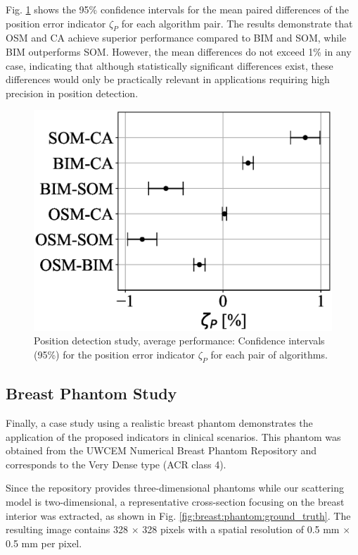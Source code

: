 \documentclass{IEEEtran}
\begin{document}
                Fig. \ref{fig:position:average:confidence_intervals} shows the 95\% confidence intervals for the mean paired differences of the position error indicator $\zeta_P$ for each algorithm pair. The results demonstrate that OSM and CA achieve superior performance compared to BIM and SOM, while BIM outperforms SOM. However, the mean differences do not exceed 1\% in any case, indicating that although statistically significant differences exist, these differences would only be practically relevant in applications requiring high precision in position detection.

                \begin{figure}
                    \centering
                    \includegraphics[width=.8\columnwidth]{./experiments/position/average/figs/confidence_intervals.eps}
                    \caption{Position detection study, average performance: Confidence intervals (95\%) for the position error indicator $\zeta_P$ for each pair of algorithms.}
                    \label{fig:position:average:confidence_intervals}
                \end{figure}

        \subsection{Breast Phantom Study}\label{sec:results:breast}

            Finally, a case study using a realistic breast phantom demonstrates the application of the proposed indicators in clinical scenarios. This phantom was obtained from the UWCEM Numerical Breast Phantom Repository \cite{burfeindt2012mri} and corresponds to the Very Dense type (ACR class 4). 

            Since the repository provides three-dimensional phantoms while our scattering model is two-dimensional, a representative cross-section focusing on the breast interior was extracted, as shown in Fig. \ref{fig:breast:phantom:ground_truth}. The resulting image contains 328 $\times$ 328 pixels with a spatial resolution of 0.5 mm $\times$ 0.5 mm per pixel. 
\end{document}

